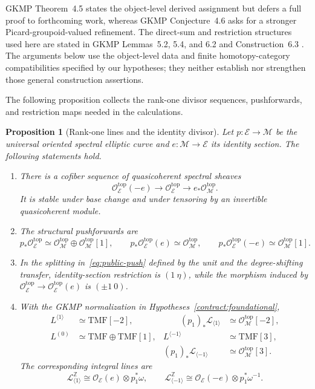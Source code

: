 \documentclass[11pt,a4paper]{amsart}
\newcommand{\Z}{\mathbb Z}
\newcommand{\TMF}{\mathrm{TMF}}
\newcommand{\cM}{\mathcal M}
\newcommand{\cE}{\mathcal E}
\newcommand{\cL}{\mathcal L}
\newcommand{\cO}{\mathcal O}
\theoremstyle{plain}
\newtheorem{proposition}[theorem]{Proposition}
\theoremstyle{definition}
\theoremstyle{remark}
\begin{document}
GKMP Theorem~4.5 states the object-level derived assignment but
defers a full proof to forthcoming work, whereas GKMP Conjecture~4.6
asks for a stronger Picard-groupoid-valued refinement. The
direct-sum and restriction structures used here are stated in GKMP
Lemmas~5.2, 5.4, and 6.2 and Construction~6.3 \cite{GKMP}.
The arguments below use the object-level data and finite
homotopy-category compatibilities specified by our hypotheses;
they neither establish nor strengthen those general construction
assertions.

The following proposition collects the rank-one divisor sequences,
pushforwards, and restriction maps needed in the calculations.

\begin{proposition}[Rank-one lines and the identity divisor]\label{prop:public-rankone}
Let $p:\cE\to\cM$ be the universal oriented spectral elliptic curve
and $e:\cM\to\cE$ its identity section. The following statements hold.
\begin{enumerate}[label=\textup{(\roman*)},leftmargin=2.6em]
\item There is a cofiber sequence of quasicoherent spectral sheaves
\begin{equation}\label{eq:public-divisor}
 \cO_{\cE}^{\mathrm{top}}(-e)\longrightarrow
 \cO_{\cE}^{\mathrm{top}}\longrightarrow
 e_*\cO_{\cM}^{\mathrm{top}}.
\end{equation}
It is stable under base change and under tensoring by an invertible
quasicoherent module.
\item The structural pushforwards are
\begin{equation}\label{eq:public-push}
 p_*\cO_{\cE}^{\mathrm{top}}\simeq
 \cO_{\cM}^{\mathrm{top}}\oplus\cO_{\cM}^{\mathrm{top}}[1],
 \qquad
 p_*\cO_{\cE}^{\mathrm{top}}(e)\simeq\cO_{\cM}^{\mathrm{top}},
 \qquad
 p_*\cO_{\cE}^{\mathrm{top}}(-e)\simeq\cO_{\cM}^{\mathrm{top}}[1].
\end{equation}
\item In the splitting in~\eqref{eq:public-push} defined by the unit
and the degree-shifting transfer, identity-section restriction is
$(1\ \eta)$, while the morphism induced by
$\cO_{\cE}^{\mathrm{top}}\to\cO_{\cE}^{\mathrm{top}}(e)$ is
$(\pm1\ 0)$.
\item With the GKMP normalization in
Hypotheses~\ref{contract:foundational},
\begin{equation}\label{eq:public-rankone-results}
 \begin{aligned}
 L^{\langle1\rangle}&\simeq\TMF[-2],
 &\qquad (p_1)_*\cL_{\langle1\rangle}&\simeq\cO_{\cM}^{\mathrm{top}}[-2],\\
 L^{(0)}&\simeq\TMF\oplus\TMF[1],
 & L^{\langle-1\rangle}&\simeq\TMF[3],\\
 && (p_1)_*\cL_{\langle-1\rangle}&\simeq\cO_{\cM}^{\mathrm{top}}[3].
 \end{aligned}
\end{equation}
The corresponding integral lines are
\[
 \cL_{\langle1\rangle}^{\Z}\cong\cO_{\cE}(e)\otimes p_1^*\omega,
 \qquad
 \cL_{\langle-1\rangle}^{\Z}\cong\cO_{\cE}(-e)\otimes p_1^*\omega^{-1}.
\]
\end{enumerate}
\end{proposition}
\end{document}
